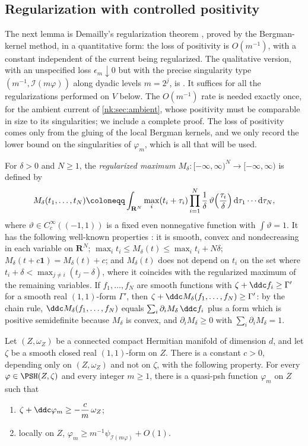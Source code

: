 \subsection{Regularization with controlled positivity}

The next lemma is Demailly's regularization theorem \cite{Dem92,DPS01},
proved by the Bergman-kernel method, in a quantitative form: the loss of
positivity is $O(m^{-1})$, with a constant independent of the current
being regularized. The qualitative version, with an unspecified loss
$\epsilon_m\downarrow0$ but with the precise singularity type
$(m^{-1},\mathcal I(m\varphi))$ along dyadic levels $m=2^j$, is
\cite[Theorem~1.6.2]{SGPT}. It suffices for all the regularizations
performed on $V$ below. The
$O(m^{-1})$ rate is needed exactly once, for the ambient current of
\cref{nk:sec:ambient}, whose positivity must be comparable in size to its
singularities; we include a complete proof. The loss of positivity comes only from
the gluing of the local Bergman kernels, and we only record the lower
bound on the singularities of $\varphi_m$, which is all that will be
used.

For $\delta>0$ and $N\ge1$, the \emph{regularized maximum}
$M_\delta\colon[-\infty,\infty)^N\to[-\infty,\infty)$ is defined by
\[
  M_\delta(t_1,\dots,t_N)\coloneqq \int_{\mathbf R^N}\max_i(t_i+\tau_i)
  \prod_{i=1}^N\frac1\delta\,\vartheta\Bigl(\frac{\tau_i}\delta\Bigr)
  \,\mathrm{d}\tau_1\cdots \mathrm{d}\tau_N,
\]
where $\vartheta\in C^\infty_c((-1,1))$ is a fixed even nonnegative
function with $\int\vartheta=1$. It has the following well-known
properties \cite[Chapter~I, Lemma~5.18]{DemCADG}: it is smooth, convex and
nondecreasing in each variable on $\mathbf R^N$;
$\max_it_i\le M_\delta(t)\le\max_it_i+N\delta$;
$M_\delta(t+c\mathbf 1)=M_\delta(t)+c$; and $M_\delta(t)$ does not
depend on $t_i$ on the set where
$t_i+\delta<\max_{j\ne i}(t_j-\delta)$, where it coincides with the
regularized maximum of the remaining variables. If $f_1,\dots,f_N$ are
smooth functions with $\zeta+\ddc f_i\ge\Gamma'$ for a smooth real
$(1,1)$-form $\Gamma'$, then
$\zeta+\ddc M_\delta(f_1,\dots,f_N)\ge\Gamma'$: by the chain rule,
$\ddc M_\delta(f_1,\dots,f_N)$ equals
$\sum_i\partial_iM_\delta\,\ddc f_i$ plus a form which is positive
semidefinite because $M_\delta$ is convex, and
$\partial_iM_\delta\ge0$ with $\sum_i\partial_iM_\delta=1$.
\begin{lemma}\label{nk:lem:regularization}
Let $(Z,\omega_Z)$ be a connected compact Hermitian manifold of
dimension $d$,
and let $\zeta$ be a smooth closed real $(1,1)$-form on $Z$. There
is a constant $c>0$, depending only on $(Z,\omega_Z)$ and not on
$\zeta$, with the following property. For every
$\varphi\in\PSH(Z,\zeta)$ and every integer $m\ge1$, there is a
quasi-psh function $\varphi_m$ on $Z$ such that
\begin{enumerate}[label=(\roman*),leftmargin=*,itemsep=.2em,topsep=.3em]
\item\label{nk:it:reg-positivity}
  $\zeta+\ddc\varphi_m\ge-\dfrac{c}{m}\,\omega_Z$;
\item\label{nk:it:reg-lower} locally on $Z$,
  $\varphi_m\ge m^{-1}\psi_{\mathcal I(m\varphi)}+O(1)$.
\end{enumerate}
\end{lemma}

